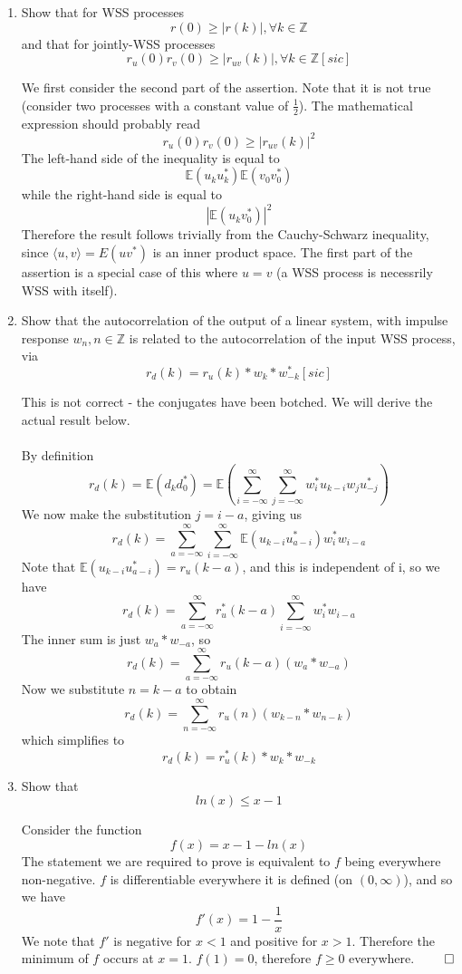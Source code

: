 \documentclass{article}
\newcommand{\chapternumber}{2}
\newenvironment{QandA}{\begin{enumerate}[label=\chapternumber.\arabic*]\bfseries\boldmath}
	{\end{enumerate}}
\newenvironment{answered}{\par\bigskip\normalfont\unboldmath}{}
\begin{document}
\begin{QandA}
	\item Show that for WSS processes
	\[r(0)\geq |r(k)|,\forall k\in \mathbb{Z}\]
	and that for jointly-WSS processes
	\[r_u(0)r_v(0)\geq|r_{uv}(k)|,\forall k\in \mathbb{Z}[sic]\]
	\begin{answered}
		We first consider the second part of the assertion. Note that it is not true (consider two processes with a constant value of $\frac{1}{2}$). The mathematical expression should probably read
		\[r_u(0)r_v(0)\geq|r_{uv}(k)|^2\]
		The left-hand side of the inequality is equal to
		\[\mathbb{E}(u_ku_k^*)\mathbb{E}(v_0v_0^*)\]
		while the right-hand side is equal to
		\[|\mathbb{E}(u_kv_0^*)|^2\]
		Therefore the result follows trivially from the Cauchy-Schwarz inequality, since $\langle u,v\rangle =E(uv^*)$ is an inner product space. The first part of the assertion is a special case of this where $u=v$ (a WSS process is necessrily WSS with itself).
		
	\end{answered}

	\item Show that the autocorrelation of the output of a linear system, with impulse response $w_n,n\in\mathbb{Z}$ is related to the autocorrelation of the input WSS process, via
	\[r_d(k)=r_u(k)* w_k* w^*_{-k}[sic]\]
	\begin{answered}
		This is not correct - the conjugates have been botched. We will derive the actual result below.\\
		\\
		By definition
		\[r_d(k)=\mathbb{E}(d_kd_0^*)=\mathbb{E}\left(\sum_{i=-\infty}^{\infty}\sum_{j=-\infty}^{\infty}w_i^*u_{k-i}w_ju_{-j}^*\right)\]
		We now make the substitution $j=i-a$, giving us
		\[r_d(k)=\sum_{a=-\infty}^{\infty}\sum_{i=-\infty}^{\infty}\mathbb{E}(u_{k-i}u_{a-i}^*)w_i^*w_{i-a}\]
		Note that $\mathbb{E}(u_{k-i}u_{a-i}^*)=r_u(k-a)$, and this is independent of i, so we have
		\[r_d(k)=\sum_{a=-\infty}^{\infty}r_u^*(k-a)\sum_{i=-\infty}^{\infty}w_i^*w_{i-a}\]
		The inner sum is just $w_a*w_{-a}$, so
		\[r_d(k)=\sum_{a=-\infty}^{\infty}r_u(k-a)(w_a*w_{-a})\]
		Now we substitute $n=k-a$ to obtain
		\[r_d(k)=\sum_{n=-\infty}^{\infty}r_u(n)(w_{k-n}*w_{n-k})\]
		which simplifies to
		\[r_d(k)=r_u^*(k)*w_k*w_{-k}\]
	\end{answered}

	\item Show that 
	\[ln(x)\leq x-1\]
	\begin{answered}
		Consider the function \[f(x)=x-1-ln(x)\]The statement we are required to prove is equivalent to $f$ being everywhere non-negative. $f$ is differentiable everywhere it is defined (on $(0,\infty)$), and so we have
		\[f'(x)=1-\frac{1}{x}\]
		We note that $f'$ is negative for $x<1$ and positive for $x>1$. Therefore the minimum of $f$ occurs at $x=1$. $f(1)=0$, therefore $f\geq0$ everywhere. $\qed$		
	\end{answered}


\end{QandA}
\end{document}
